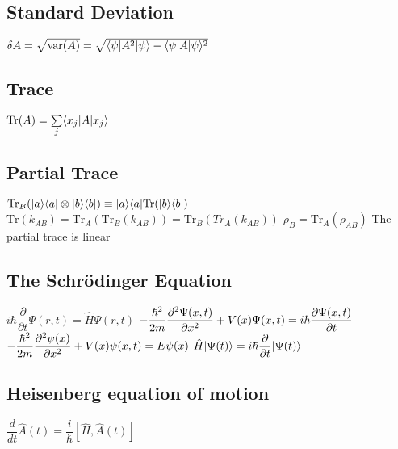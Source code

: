 \subsection{Standard Deviation}
\begin{itemize}
\itemt \( \delta A = \sqrt{\mathrm{var}(A)} = \sqrt{\langle\psi\rvert A^2 \lvert\psi\rangle - \langle\psi\rvert A \lvert\psi\rangle^2} \)
\end{itemize}

\subsection{Trace}
\begin{itemize}
\itemt \( \mathrm{Tr} (A) = \sum\limits_{j} \langle x_j\rvert A \lvert x_j\rangle \)
\end{itemize}

\subsection{Partial Trace}			
\begin{itemize}
\itemt \( \mathrm{Tr}_B(\lvert a\rangle\langle a\rvert\otimes\lvert b\rangle\langle b\rvert) \equiv \lvert a\rangle\langle a\rvert \mathrm{Tr} (\lvert b\rangle\langle b\rvert) \)
\itemt \( \mathrm{Tr} (k_{AB}) = \mathrm{Tr}_A(\mathrm{Tr}_B(k_{AB})) = \mathrm{Tr}_B(Tr_A(k_{AB})) \)
\itemt \( \rho_B = \mathrm{Tr}_A(\rho_{AB}) \)
\itemt The partial trace is linear
\end{itemize}

\subsection{The Schr\"odinger Equation}			
\begin{itemize}
\itemt \( i \hbar \dfrac{\partial }{\partial t} \Psi (r,t) = \hat{H} \Psi(r,t) \)
\itemt \( -\dfrac{\hbar^2}{2m} \dfrac{\partial ^2 \Psi(x,t)}{\partial x^2} + V(x)\Psi(x,t) = i\hbar\dfrac{\partial \Psi(x,t)}{\partial t} \)
\itemt \( -\dfrac{\hbar^2}{2m} \dfrac{\partial ^2 \psi(x)}{\partial x^2} + V(x)\psi(x,t) = E\psi(x) \)
\itemt \( \hat{H}\lvert\Psi(t)\rangle = i\hbar \dfrac{\partial }{\partial t} \lvert\Psi(t)\rangle \)
\end{itemize}

\subsection{Heisenberg equation of motion}			
\begin{itemize}
\itemt \( \dfrac{d}{dt} \hat{A}(t) = \dfrac{i}{\hbar}[\hat{H},\hat{A}(t)] \)
\end{itemize}			

